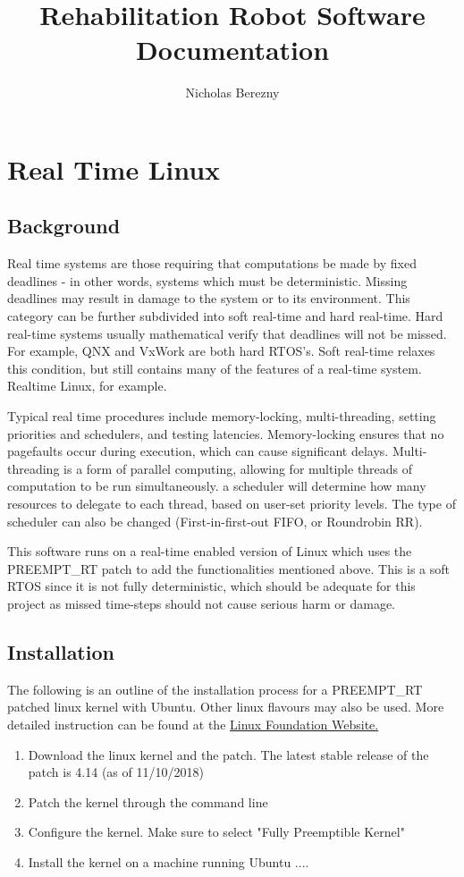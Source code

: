\documentclass{article}
\author{Nicholas Berezny}
\title{Rehabilitation Robot Software Documentation}
\begin{document}
\maketitle
\newpage

\section{Real Time Linux}
	\subsection{Background}
	
	Real time systems are those requiring that computations be made by fixed deadlines - in other words, systems which must be deterministic. Missing deadlines may result in damage to the system or to its environment. This category can be further subdivided into soft real-time and hard real-time. Hard real-time systems usually mathematical verify that deadlines will not be missed.  For example, QNX and VxWork are both hard RTOS's. Soft real-time relaxes this condition, but still contains many of the features of a real-time system. Realtime Linux, for example. 

	Typical real time procedures include memory-locking, multi-threading, setting priorities and schedulers, and testing latencies. Memory-locking ensures that no pagefaults occur during execution, which can cause significant delays. Multi-threading is a form of parallel computing, allowing for multiple threads of computation to be run simultaneously. a scheduler will determine how many resources to delegate to each thread, based on user-set priority levels. The type of scheduler can also be changed (First-in-first-out FIFO, or Roundrobin RR).

	This software runs on a real-time enabled version of Linux which uses the PREEMPT\_RT patch to add the functionalities mentioned above. This is a soft RTOS since it is not fully deterministic, which should be adequate for this project as missed time-steps should not cause serious harm or damage.
	
		
	\subsection{Installation}
	
	The following is an outline of the installation process for a PREEMPT\_RT patched linux kernel with Ubuntu. Other linux flavours may also be used. More detailed instruction can be found at the \href{https://wiki.linuxfoundation.org/realtime/documentation/howto/applications/preemptrt_setup}{Linux Foundation Website.}
	\begin{enumerate}
		\item Download the linux kernel and the patch. The latest stable release of the patch is  4.14 (as of 11/10/2018)
		\item Patch the kernel through the command line
		\item Configure the kernel. Make sure to select "Fully Preemptible Kernel"
		\item Install the kernel on a machine running Ubuntu ....
	\end{enumerate}
	
\end{document}
